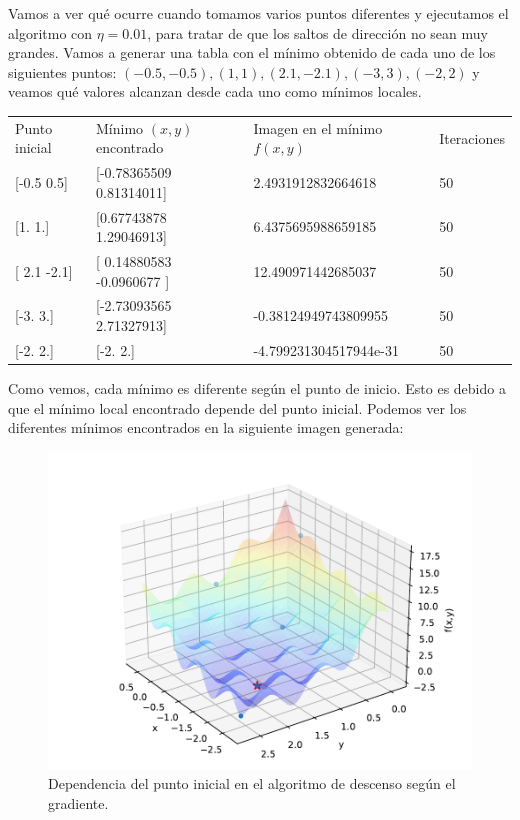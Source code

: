 \documentclass[12pt]{scrartcl}
\begin{document}
{Vamos a ver qué ocurre cuando tomamos varios puntos diferentes y ejecutamos el algoritmo con $\eta = 0.01$, para tratar de que los saltos de dirección no sean muy grandes. Vamos a generar una tabla con el mínimo obtenido de cada uno de los siguientes puntos:
$(-0.5,-0.5),(1,1),(2.1,-2.1),(-3,3),(-2,2)$ y veamos qué valores alcanzan desde cada uno como mínimos locales.

\begin{table}[H]
  \begin{tabular}{llll}
  Punto inicial   & Mínimo $(x,y)$ encontrado       & Imagen en el mínimo $f(x,y)$ & Iteraciones \\
  {[}-0.5  0.5{]} & {[}-0.78365509  0.81314011{]} & 2.4931912832664618           & 50          \\
  {[}1. 1.{]}     & {[}0.67743878 1.29046913{]}   & 6.4375695988659185           & 50          \\
  {[} 2.1 -2.1{]} & {[} 0.14880583 -0.0960677 {]} & 12.490971442685037           & 50          \\
  {[}-3.  3.{]}   & {[}-2.73093565  2.71327913{]} & -0.38124949743809955         & 50          \\
  {[}-2.  2.{]}   & {[}-2.  2.{]}                 & -4.799231304517944e-31       & 50         
  \end{tabular}
\end{table}


Como vemos, cada mínimo es diferente según el punto de inicio. Esto es debido a que el mínimo local encontrado depende del punto inicial. Podemos ver los diferentes mínimos encontrados en la siguiente imagen generada:

\begin{figure}[H]
  \centering
  \includegraphics[scale=0.6]{media/E1-2-minimums-moved.pdf}
  \caption{Dependencia del punto inicial en el algoritmo de descenso según el gradiente.}
\end{figure}


}
\end{document}
